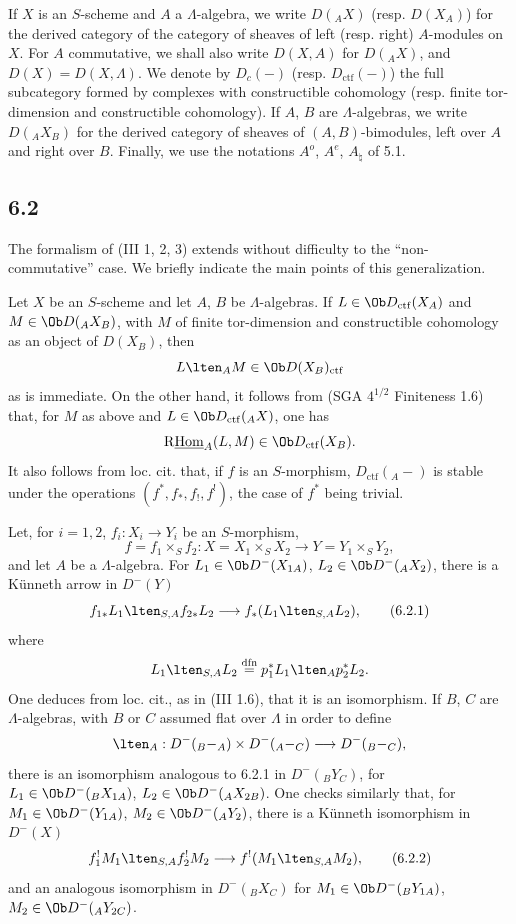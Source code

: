 If $X$ is an $S$-scheme and $A$ a $\Lambda$-algebra, we write $D({}_AX)$ (resp. $D(X_A)$) for the derived category of the category of sheaves of left (resp. right) $A$-modules on $X$. For $A$ commutative, we shall also write $D(X,A)$ for $D({}_AX)$, and $D(X)=D(X,\Lambda)$. We denote by $D_c(-)$ (resp. $D_{\mathrm{ctf}}(-)$) the full subcategory formed by complexes with constructible cohomology (resp. finite tor-dimension and constructible cohomology). If $A$, $B$ are $\Lambda$-algebras, we write $D({}_AX_B)$ for the derived category of sheaves of $(A,B)$-bimodules, left over $A$ and right over $B$. Finally, we use the notations $A^o$, $A^e$, $A_{\natural}$ of 5.1.

\subsection*{6.2}
The formalism of (III 1, 2, 3) extends without difficulty to the “non-commutative” case. We briefly indicate the main points of this generalization.

Let $X$ be an $S$-scheme and let $A$, $B$ be $\Lambda$-algebras. If $L\in\Ob D_{\mathrm{ctf}}(X_A)$ and $M\in\Ob D({}_AX_B)$, with $M$ of finite tor-dimension and constructible cohomology as an object of $D(X_B)$, then
\[
L\lten_A M\in\Ob D(X_B)_{\mathrm{ctf}}
\]
as is immediate. On the other hand, it follows from (SGA $4^{1/2}$ Finiteness 1.6) that, for $M$ as above and $L\in\Ob D_{\mathrm{ctf}}({}_AX)$, one has
\[
\mathrm{R}\underline{\mathrm{Hom}}_A(L,M)\in\Ob D_{\mathrm{ctf}}(X_B).
\]
It also follows from loc. cit. that, if $f$ is an $S$-morphism, $D_{\mathrm{ctf}}({}_A-)$ is stable under the operations $(f^*,f_*,f_!,f^!)$, the case of $f^*$ being trivial.

Let, for $i=1,2$, $f_i:X_i\to Y_i$ be an $S$-morphism,
\[
f=f_1\times_S f_2:X=X_1\times_SX_2\longrightarrow Y=Y_1\times_SY_2,
\]
and let $A$ be a $\Lambda$-algebra. For $L_1\in\Ob D^-(X_{1A})$, $L_2\in\Ob D^-({}_AX_2)$, there is a Künneth arrow in $D^-(Y)$
\begin{equation}
f_{1*}L_1\lten_{S,A}f_{2*}L_2
\longrightarrow
f_*(L_1\lten_{S,A}L_2),
\tag{6.2.1}
\end{equation}
where
\[
L_1\lten_{S,A}L_2
\stackrel{\mathrm{dfn}}{=}p_1^*L_1\lten_Ap_2^*L_2.
\]
One deduces from loc. cit., as in (III 1.6), that it is an isomorphism. If $B$, $C$ are $\Lambda$-algebras, with $B$ or $C$ assumed flat over $\Lambda$ in order to define
\[
\lten_A:D^-({}_B{-}_A)\times D^-({}_A{-}_C)\longrightarrow D^-({}_B{-}_C),
\]
there is an isomorphism analogous to 6.2.1 in $D^-({}_BY_C)$, for $L_1\in\Ob D^-({}_BX_{1A})$, $L_2\in\Ob D^-({}_AX_{2B})$. One checks similarly that, for $M_1\in\Ob D^-(Y_{1A})$, $M_2\in\Ob D^-({}_AY_2)$, there is a Künneth isomorphism in $D^-(X)$
\begin{equation}
f_1^!M_1\lten_{S,A}f_2^!M_2
\longrightarrow
f^!(M_1\lten_{S,A}M_2),
\tag{6.2.2}
\end{equation}
and an analogous isomorphism in $D^-({}_B X_C)$ for $M_1\in\Ob D^-({}_BY_{1A})$, $M_2\in\Ob D^-({}_AY_{2C})$.

